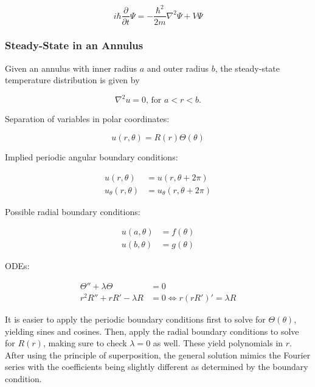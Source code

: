 \begin{equation*}
    i\hbar\frac{\partial}{\partial t} \Psi = -\frac{\hbar^2}{2m}\nabla^2 \Psi + V\Psi
\end{equation*}

\subsubsection{Steady-State in an Annulus}

Given an annulus with inner radius $a$ and outer radius $b$, the steady-state temperature distribution is given by

\begin{equation*}
    \nabla^2 u = 0\text{, for } a < r < b\text{.}
\end{equation*}

Separation of variables in polar coordinates:

\begin{equation*}
    u(r, \theta) = R(r)\Theta(\theta)
\end{equation*}

Implied periodic angular boundary conditions:

\begin{align*}
    u(r, \theta)        & = u(r, \theta + 2\pi)        \\
    u_\theta(r, \theta) & = u_\theta(r, \theta + 2\pi)
\end{align*}

Possible radial boundary conditions:

\begin{align*}
    u(a, \theta) & = f(\theta) \\
    u(b, \theta) & = g(\theta)
\end{align*}

ODEs:

\begin{align*}
    \Theta'' + \lambda\Theta   & = 0                                     \\
    r^2 R'' + r R' - \lambda R & = 0 \Leftrightarrow r(rR')' = \lambda R
\end{align*}

It is easier to apply the periodic boundary conditions first to solve for $\Theta(\theta)$, yielding sines and cosines. Then, apply the radial boundary conditions to solve for $R(r)$, making sure to check $\lambda = 0$ as well. These yield polynomials in $r$. After using the principle of superposition, the general solution mimics the Fourier series with the coefficients being slightly different as determined by the boundary condition.


